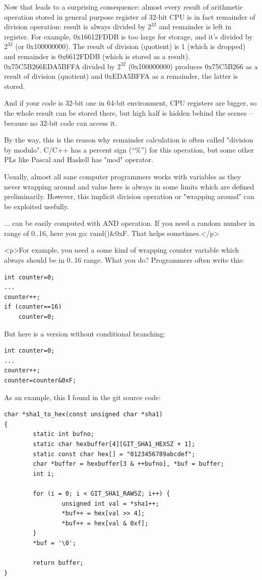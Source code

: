 Now that leads to a surprising consequence: almost every result of arithmetic operation stored in general purpose register of
32-bit CPU is in fact
remainder of division operation: result is always divided by $2^{32}$ and remainder is left in register.
For example, 0x16612FDDB is too large for storage, and it's divided by $2^{32}$ (or 0x100000000).
The result of division (quotient) is 1 (which is dropped) and remainder is 0x6612FDDB (which is stored as a result).
0x75C5B266EDA5BFFA divided by $2^{32}$ (0x100000000) produces 0x75C5B266 as a result of division (quotient) and 0xEDA5BFFA as a remainder, the latter is stored.

And if your code is 32-bit one in 64-bit environment, CPU registers are bigger, so the whole result can be stored there,
but high half is hidden behind the scenes -- because no 32-bit code can access it.

By the way, this is the reason why remainder calculation is often called "division by modulo".
C/C++ has a percent sign (``\%'') for this operation, but some other PLs like Pascal and Haskell has "mod" operator.

Usually, almost all sane computer programmers works with variables as they never wrapping around and value here is always in some limits which
are defined preliminarily.
However, this implicit division operation or "wrapping around" can be exploited usefully.


... can be easily computed with AND operation.
If you need a random number in range of 0..16, here you go: rand()\&0xF.
That helps sometimes.</p>

<p>For example, you need a some kind of wrapping counter variable which always should be in 0..16 range. What you do?
Programmers often write this:

\begin{lstlisting}[style=customc]
int counter=0;
...
counter++;
if (counter==16)
    counter=0;
\end{lstlisting}

But here is a version without conditional branching:

\begin{lstlisting}[style=customc]
int counter=0;
...
counter++;
counter=counter&0xF;
\end{lstlisting}

As an example, this I found in the git source code:

\begin{lstlisting}[style=customc]
char *sha1_to_hex(const unsigned char *sha1)
{
        static int bufno;
        static char hexbuffer[4][GIT_SHA1_HEXSZ + 1];
        static const char hex[] = "0123456789abcdef";
        char *buffer = hexbuffer[3 & ++bufno], *buf = buffer;
        int i;

        for (i = 0; i < GIT_SHA1_RAWSZ; i++) {
                unsigned int val = *sha1++;
                *buf++ = hex[val >> 4];
                *buf++ = hex[val & 0xf];
        }
        *buf = '\0';

        return buffer;
}
\end{lstlisting}

